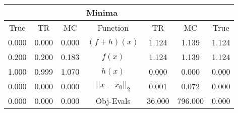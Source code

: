 \begin{tabular}{| c |c |c || c |c |c |c |}
    \hline
    \rowcolor[gray]{0.9}
\multicolumn{3}{|c|}{Parameters} & \multicolumn{4}{|c|}{Minima}\\ \hline True & TR & MC  & Function & TR & MC & True \\
    \hline
  \rowcolor[gray]{0.7}
  0.000 & 0.000 & 0.000   & $ (f + h)(x) $ & 1.124 & 1.139 & 1.124 \\
  \rowcolor[gray]{0.8}
  0.200 & 0.200 & 0.183   & $ f(x) $ & 1.124 & 1.139 & 1.124 \\
  \rowcolor[gray]{0.7}
  1.000 & 0.999 & 1.070   & $ h(x) $ & 0.000 & 0.000 & 0.000 \\
  \rowcolor[gray]{0.8}
  0.000 & 0.000 & 0.000   & $ ||x - x_0||_2 $ & 0.001 & 0.072 & 0.000 \\
  \rowcolor[gray]{0.7}
  0.000 & 0.000 & 0.000   & Obj-Evals & 36.000 & 796.000 & 0.000 \\
\end{tabular}
